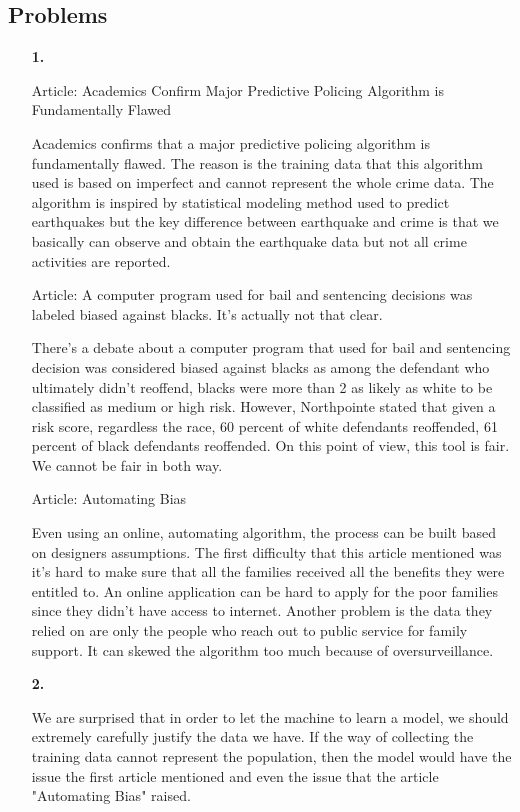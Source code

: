 \documentclass[11pt]{article}
\begin{document}
\subsection * {Problems}

\begin{enumerate}

\item [\textbf{1.}]  

Article: Academics Confirm Major Predictive Policing Algorithm is Fundamentally Flawed

Academics confirms that a major predictive policing algorithm is fundamentally flawed. The reason is the training data that this algorithm used is based on imperfect and cannot represent the whole crime data. The algorithm is inspired by statistical modeling method used to predict earthquakes but the key difference between earthquake and crime is that we basically can observe and obtain the earthquake data but not all crime activities are reported.

Article: A computer program used for bail and sentencing decisions was labeled biased against blacks. It’s actually not that clear.

There's a debate about a computer program that used for bail and sentencing decision was considered biased against blacks as among the defendant who ultimately didn't reoffend, blacks were more than 2 as likely as white to be classified as medium or high risk. However, Northpointe stated that given a risk score, regardless the race, 60 percent of white defendants reoffended, 61 percent of black defendants reoffended. On this point of view, this tool is fair. We cannot be fair in both way.

Article: Automating Bias

Even using an online, automating algorithm, the process can be built based on designers assumptions. The first difficulty that this article mentioned was it's hard to make sure that all the families received all the benefits they were entitled to. An online application can be hard to apply for the poor families since they didn't have access to internet. Another problem is the data they relied on are only the people who reach out to public service for family support. It can skewed the algorithm too much because of oversurveillance.  

\item[\textbf{2.}]

We are surprised that in order to let the machine to learn a model, we should extremely carefully justify the data we have. If the way of collecting the training data cannot represent the population, then the model would have the issue the first article mentioned and even the issue that the article "Automating Bias" raised. 


\end{enumerate}
\end{document}
